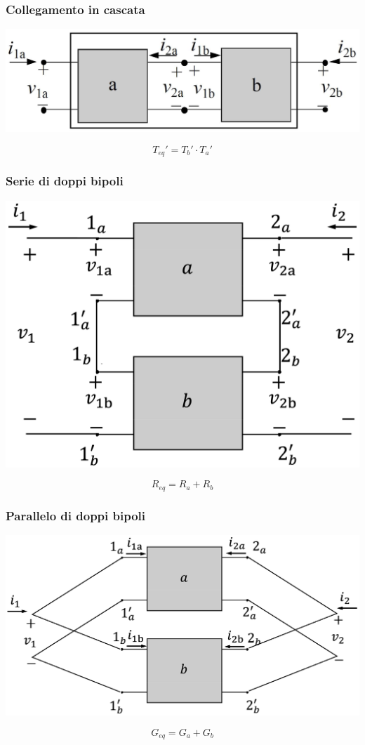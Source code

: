 \documentclass[a4paper]{article}
\begin{document}
\begin{multicols}{2}
	\subsubsection*{Collegamento in cascata}
	\begin{center}
		\includegraphics[width=0.8\linewidth]{dbp_cascata.png}
	\end{center}
	\[T_{eq}' = T_b' \cdot T_a'\]
	
	\subsubsection*{Serie di doppi bipoli}
	\begin{center}
		\includegraphics[width=0.7\linewidth]{dbp_serie.png}
	\end{center}
	\[R_{eq} = R_a + R_b\]
	
	\subsubsection*{Parallelo di doppi bipoli}
	\begin{center}
		\includegraphics[width=0.9\linewidth]{dbp_parallelo.png}
	\end{center}
	\[G_{eq} = G_a + G_b\]


\end{multicols}
\end{document}
